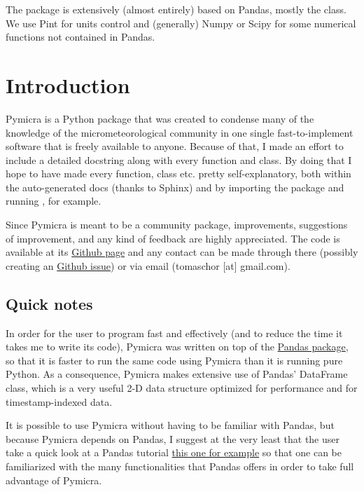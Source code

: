 \documentclass[a4paper,10pt,oneside]{sphinxmanual}
\begin{document}
The package is extensively (almost entirely) based on Pandas, mostly the
 class. We use Pint for units control and (generally) Numpy
or Scipy for some numerical functions not contained in Pandas.


\chapter{Introduction}
\label{intro:introduction}\label{intro:pymicra-a-python-tool-for-micrometeorological-analyses}\label{intro::doc}\label{intro:id2}
Pymicra is a Python package that was created to condense many of the knowledge
of the micrometeorological community in one single fast-to-implement software
that is freely available to anyone. Because of that, I made an effort to
include a detailed docstring along with every function and class. By doing that
I hope to have made every function, class etc. pretty self-explanatory, both
within the auto-generated docs (thanks to Sphinx) and by importing the package
and running , for example.

Since Pymicra is meant to be a community package, improvements, suggestions of
improvement, and any kind of feedback are highly appreciated. The code is
available at its \href{https://github.com/tomchor/pymicra}{Github page} and any contact can be made through there
(possibly creating an \href{https://github.com/tomchor/pymicra/issues}{Github issue}) or via email (tomaschor {[}at{]} gmail.com).


\section{Quick notes}
\label{intro:quick-notes}
In order for the user to program fast and effectively (and to reduce the time it
takes me to write its code), Pymicra was written on top of the
\href{http://pandas.pydata.org/}{Pandas package}, so that it is faster to run
the same code using Pymicra than it is running pure Python. As a consequence,
Pymicra makes extensive use of Pandas' DataFrame class, which is a very useful
2-D data structure optimized for performance and for timestamp-indexed data.

It is possible to use Pymicra without having to be familiar with Pandas, but
because Pymicra depends on Pandas, I suggest at the very least that the user
take a quick look at a Pandas tutorial
\href{http://pandas.pydata.org/pandas-docs/stable/10min.html}{this one for example}
so that one can be familiarized with the many functionalities that
Pandas offers in order to take full advantage of Pymicra.
\end{document}
